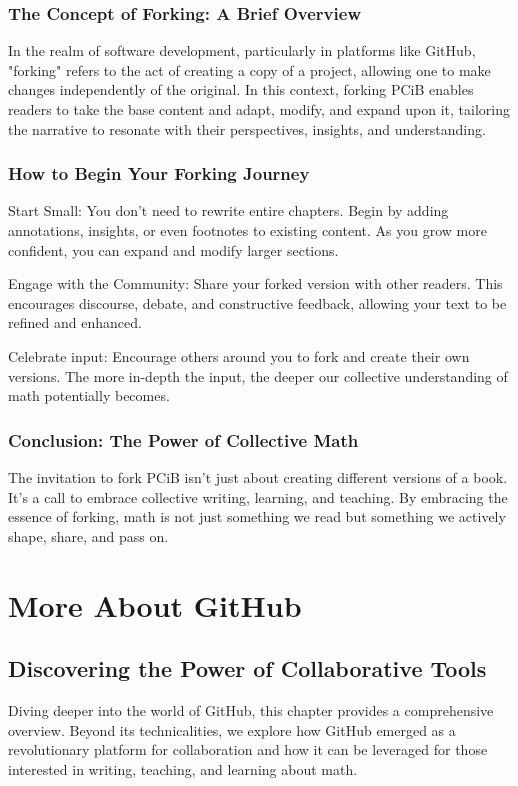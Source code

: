 \documentclass[a4paper,12pt]{book}
\begin{document}
\subsection*{The Concept of Forking: A Brief Overview}

In the realm of software development, particularly in platforms like GitHub, "forking" refers to the act of creating a copy of a project, allowing one to make changes independently of the original. In this context, forking PCiB enables readers to take the base content and adapt, modify, and expand upon it, tailoring the narrative to resonate with their perspectives, insights, and understanding.

\subsection*{How to Begin Your Forking Journey}

Start Small: You don't need to rewrite entire chapters. Begin by adding annotations, insights, or even footnotes to existing content. As you grow more confident, you can expand and modify larger sections.

Engage with the Community: Share your forked version with other readers. This encourages discourse, debate, and constructive feedback, allowing your text to be refined and enhanced.

Celebrate input: Encourage others around you to fork and create their own versions. The more in-depth the input, the deeper our collective understanding of math potentially becomes.

\subsection*{Conclusion: The Power of Collective Math}

The invitation to fork PCiB isn't just about creating different versions of a book. It's a call to embrace collective writing, learning, and teaching. By embracing the essence of forking, math is not just something we read but something we actively shape, share, and pass on.

\chapter{More About GitHub}
\section*{Discovering the Power of Collaborative Tools}
Diving deeper into the world of GitHub, this chapter provides a comprehensive overview. Beyond its technicalities, we explore how GitHub emerged as a revolutionary platform for collaboration and how it can be leveraged for those interested in writing, teaching, and learning about math.
\end{document}
